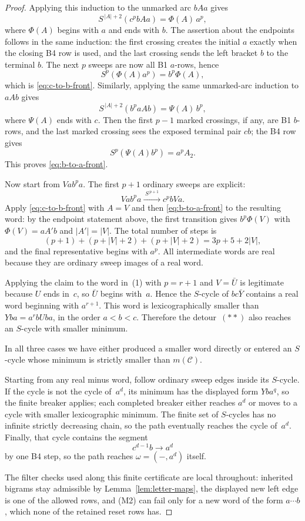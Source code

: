 \documentclass{amsart}
\theoremstyle{definition}
\theoremstyle{remark}
\begin{document}
\begin{proof}
Applying this induction to the unmarked arc $bAa$ gives
\[
  S^{\,|A|+2}(c^p bAa)=\Phi(A)\,a^p,
\]
where $\Phi(A)$ begins with $a$ and ends with $b$.  The assertion about
the endpoints follows in the same induction: the first crossing creates
the initial $a$ exactly when the closing B4 row is used, and the last
crossing sends the left bracket $b$ to the terminal $b$.  The next
$p$ sweeps are now all B1 $a$-rows, hence
\[
  S^p(\Phi(A)a^p)=b^p\Phi(A),
\]
which is \eqref{eq:c-to-b-front}.  Similarly, applying the same
unmarked-arc induction to $aAb$ gives
\[
  S^{\,|A|+2}(b^p aAb)=\Psi(A)\,b^p,
\]
where $\Psi(A)$ ends with $c$.  Then the first $p-1$ marked crossings,
if any, are B1 $b$-rows, and the last marked crossing sees the exposed
terminal pair $cb$; the B4 row gives
\[
  S^p(\Psi(A)b^p)=a^p A_2 .
\]
This proves \eqref{eq:b-to-a-front}.

Now start from $Vab^pa$.  The first $p+1$ ordinary sweeps are explicit:
\[
  Vab^pa \xrightarrow{\;S^{\,p+1}\;} c^p bVa .
\]
Apply \eqref{eq:c-to-b-front} with $A=V$ and then
\eqref{eq:b-to-a-front} to the resulting word: by the endpoint
statement above, the first transition gives $b^p\Phi(V)$ with
$\Phi(V)=aA'b$ and $|A'|=|V|$.  The total number of
steps is
\[
  (p+1)+(p+|V|+2)+(p+|V|+2)=3p+5+2|V|,
\]
and the final representative begins with $a^p$.  All intermediate
words are real because they are ordinary sweep images of a real word.

Applying the claim to the word in~\textup{(1)} with
$p=r+1$ and $V=\bar U$ is legitimate because $U$ ends in~$c$, so
$\bar U$ begins with~$a$.  Hence the $S$-cycle of $bc\bar Y$ contains
a real word beginning with $a^{r+1}$.  This word is lexicographically
smaller than $Yba=a^r bUba$, in the order $a<b<c$.  Therefore the
detour~$(**)$ also reaches an $S$-cycle with smaller minimum.

In all three cases we have either produced a smaller word directly or
entered an $S$-cycle whose minimum is strictly smaller than
$m(\mathcal C)$.

Starting from any real minus word, follow ordinary sweep edges inside
its $S$-cycle.  If the cycle is not the cycle of~$a^d$, its minimum has
the displayed form $Yba^q$, so the finite breaker applies; each
completed breaker either reaches $a^d$ or moves to a cycle with smaller
lexicographic minimum.  The finite set of $S$-cycles has no infinite
strictly decreasing chain, so the path eventually reaches the cycle
of~$a^d$.  Finally, that cycle contains the segment
\[
  c^{d-1}b \longrightarrow a^d
\]
by one B4 step, so the path reaches $\omega=(-,a^d)$ itself.

The filter checks used along this finite certificate are local
throughout: inherited bigrams stay admissible by
Lemma~\ref{lem:letter-maps}, the displayed new left edge is one of
the allowed rows, and \textup{(M2)} can fail only for a new word of
the form $a\cdots b$, which none of the retained reset rows has.
\end{proof}
\end{document}
